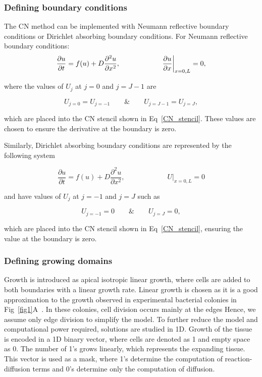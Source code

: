 \documentclass[10pt,letterpaper]{article}
\newcommand{\pdvn}[3]{\frac{\partial^{#1} {#2}}{\partial {#3}^{#1}}}
\begin{document}
\subsubsection*{Defining boundary conditions}\label{methods_boundary_conditions_CN}
The CN method can be implemented with Neumann reflective boundary conditions or Dirichlet absorbing boundary conditions.
For Neumann reflective boundary conditions:
\begin{equation}
    \frac{\partial u}{\partial t} =  f(u) + D\pdvn{2}{u}{x},   \quad \quad \quad \quad \quad \quad \pdv{u}{x}\biggr\rvert_{x=0,L}=0,
\end{equation}

where the values of $U_{j}$ at $j=0$ and $j=J-1$ are

\begin{equation}
    U_{j=0} = U_{j=-1}  \quad \quad \&  \quad \quad  U_{j=J-1} = U_{j=J},
\end{equation}

which are placed into the CN stencil shown in Eq~\ref{CN_stencil}.
These values are chosen to ensure the derivative at the boundary is zero.

Similarly, Dirichlet absorbing boundary conditions are represented by the following system

\begin{equation}
    \frac{\partial u}{\partial t} =  f(u) + D\pdvn{2}{u}{x},   \quad \quad \quad \quad \quad \quad U\biggr\rvert_{x=0,L}=0
\end{equation}

and have values of $U_{j}$ at $j=-1$ and $j=J$ such as

\begin{equation}
    U_{j=-1} = 0  \quad \quad \&  \quad \quad  U_{j=J} = 0,
\end{equation}

which are placed into the CN stencil shown in Eq~\ref{CN_stencil},
ensuring the value at the boundary is zero.


\subsubsection*{Defining growing domains}
Growth is introduced as apical isotropic linear growth, where cells are added to both boundaries with a linear growth rate.
Linear growth is chosen as it is a good approximation to the growth observed in experimental bacterial colonies in Fig~\ref{fig1}A~\parencite{Oliver2023}.
In these colonies, cell division occurs mainly at the edges Hence, we assume only edge division to simplify the model.
To further reduce the model and computational power required, solutions are studied in 1D.
Growth of the tissue is encoded in a 1D binary vector, where cells are denoted as 1 and empty space as 0.
The number of 1's grows linearly, which represents the expanding tissue.
This vector is used as a mask, where 1's determine the computation of reaction-diffusion terms and 0's determine only the computation of diffusion.
\end{document}
